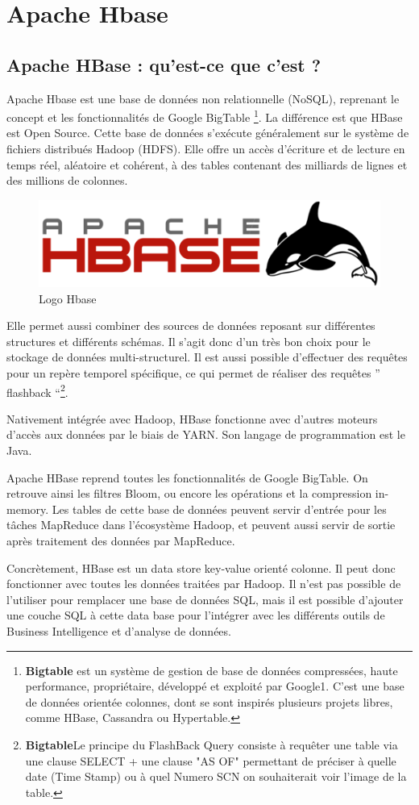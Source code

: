 \section{Apache Hbase}

\subsection{Apache HBase : qu’est-ce que c’est ?}

Apache Hbase est une base de données non relationnelle (NoSQL), reprenant le concept et les fonctionnalités de Google BigTable \footnote{\textbf{Bigtable} est un système de gestion de base de données compressées, haute performance, propriétaire, développé et exploité par Google1. C'est une base de données orientée colonnes, dont se sont inspirés plusieurs projets libres, comme HBase, Cassandra ou Hypertable.}. 
La différence est que HBase est Open Source. Cette base de données s’exécute généralement sur le système de fichiers distribués Hadoop (HDFS). Elle offre un accès d’écriture et de lecture en temps réel, aléatoire et cohérent, à des tables contenant des milliards de lignes et des millions de colonnes.

\begin{figure}[h]
	\centering
    \includegraphics[scale=0.6]{img/part1/4.9}
    \caption{Logo Hbase}
\end{figure}

Elle  permet aussi combiner des sources de données reposant sur différentes structures et différents schémas. Il s’agit donc d’un très bon choix pour le stockage de données multi-structurel. Il est aussi possible d’effectuer des requêtes pour un repère temporel spécifique, ce qui permet de réaliser des requêtes ” flashback “\footnote{\textbf{Bigtable}Le principe du FlashBack Query consiste à requêter une table via une clause SELECT + une clause "AS OF" permettant de préciser à quelle date (Time Stamp) ou à quel Numero SCN on souhaiterait voir l'image de la table.}.

Nativement intégrée avec Hadoop, HBase fonctionne avec d’autres moteurs d’accès aux données par le biais de YARN. Son langage de programmation est le Java.

Apache HBase reprend toutes les fonctionnalités de Google BigTable. On retrouve ainsi les filtres Bloom, ou encore les opérations et la compression in-memory. Les tables de cette base de données peuvent servir d’entrée pour les tâches MapReduce dans l’écosystème Hadoop, et peuvent aussi servir de sortie après traitement des données par MapReduce.

Concrètement, HBase est un data store key-value orienté colonne. Il peut donc fonctionner avec toutes les données traitées par Hadoop. Il n’est pas possible de l’utiliser pour remplacer une base de données SQL, mais il est possible d’ajouter une couche SQL à cette data base pour l’intégrer avec les différents outils de Business Intelligence et d’analyse de données.
